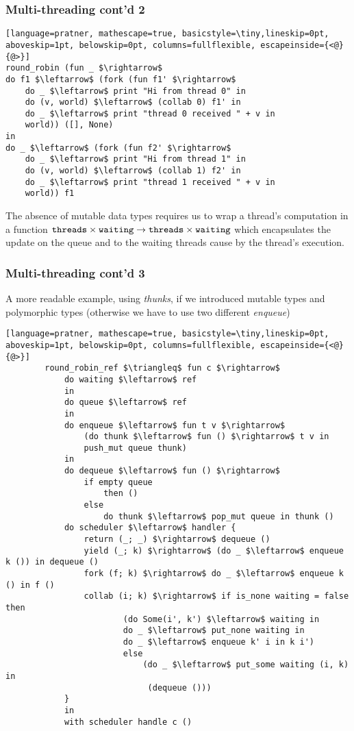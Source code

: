 \documentclass[t]{beamer}
\begin{document}
\begin{frame}[fragile]
	\frametitle{Multi-threading cont'd 2}
	\begin{lstlisting}[language=pratner, mathescape=true, basicstyle=\tiny,lineskip=0pt, aboveskip=1pt, belowskip=0pt, columns=fullflexible, escapeinside={<@}{@>}]
round_robin (fun _ $\rightarrow$
do f1 $\leftarrow$ (fork (fun f1' $\rightarrow$ 
	do _ $\leftarrow$ print "Hi from thread 0" in
	do (v, world) $\leftarrow$ (collab 0) f1' in 
	do _ $\leftarrow$ print "thread 0 received " + v in
	world)) ([], None)
in
do _ $\leftarrow$ (fork (fun f2' $\rightarrow$ 
	do _ $\leftarrow$ print "Hi from thread 1" in
	do (v, world) $\leftarrow$ (collab 1) f2' in
	do _ $\leftarrow$ print "thread 1 received " + v in
	world)) f1
	\end{lstlisting}
	
	The absence of mutable data types requires us to wrap a thread's computation in a function $\verb|threads| \times \verb|waiting| \rightarrow \verb|threads| \times \verb|waiting|$ which encapsulates the update on the queue and to the waiting threads cause by the thread's execution.
	
\end{frame}

	\begin{frame}[fragile]
	\frametitle{Multi-threading cont'd 3}
	A more readable example, using \textit{thunks}, if we introduced \alert{mutable types} and \alert{polymorphic types} (otherwise we have to use two different \textit{enqueue})
	\begin{lstlisting}[language=pratner, mathescape=true, basicstyle=\tiny,lineskip=0pt, aboveskip=1pt, belowskip=0pt, columns=fullflexible, escapeinside={<@}{@>}]
		round_robin_ref $\triangleq$ fun c $\rightarrow$
			do waiting $\leftarrow$ ref 
			in
			do queue $\leftarrow$ ref 
			in
			do enqueue $\leftarrow$ fun t v $\rightarrow$ 
				(do thunk $\leftarrow$ fun () $\rightarrow$ t v in 
				push_mut queue thunk) 
			in
			do dequeue $\leftarrow$ fun () $\rightarrow$ 
				if empty queue 
					then () 
				else 
					do thunk $\leftarrow$ pop_mut queue in thunk ()
			do scheduler $\leftarrow$ handler {
				return (_; _) $\rightarrow$ dequeue ()
				yield (_; k) $\rightarrow$ (do _ $\leftarrow$ enqueue k ()) in dequeue ()
				fork (f; k) $\rightarrow$ do _ $\leftarrow$ enqueue k () in f ()
				collab (i; k) $\rightarrow$ if is_none waiting = false then 
						(do Some(i', k') $\leftarrow$ waiting in 
						do _ $\leftarrow$ put_none waiting in
						do _ $\leftarrow$ enqueue k' i in k i')
						else 
						    (do _ $\leftarrow$ put_some waiting (i, k) in
						     (dequeue ())) 
			} 
			in
			with scheduler handle c ()
	\end{lstlisting}
\end{frame}
\end{document}
